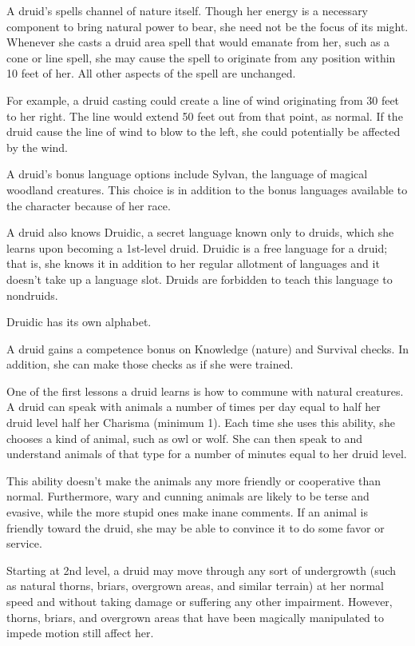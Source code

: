  A druid's spells channel of nature itself. Though her energy is a necessary component to bring natural power to bear, she need not be the focus of its might. Whenever she casts a druid area spell that would emanate from her, such as a cone or line spell, she may cause the spell to originate from any position within 10 feet of her. All other aspects of the spell are unchanged.

For example, a druid casting  could create a line of wind originating from 30 feet to her right. The line would extend 50 feet out from that point, as normal. If the druid cause the line of wind to blow to the left, she could potentially be affected by the wind.

 A druid's bonus language options include Sylvan, the language of magical woodland creatures. This choice is in addition to the bonus languages available to the character because of her race.

A druid also knows Druidic, a secret language known only to druids, which she learns upon becoming a 1st-level druid. Druidic is a free language for a druid; that is, she knows it in addition to her regular allotment of languages and it doesn't take up a language slot. Druids are forbidden to teach this language to nondruids.

Druidic has its own alphabet.

 A druid gains a  competence bonus on Knowledge (nature) and Survival checks. In addition, she can make those checks as if she were trained.

 One of the first lessons a druid learns is how to commune with natural creatures. A druid can speak with animals a number of times per day equal to half her druid level \add half her Charisma (minimum 1). Each time she uses this ability, she chooses a kind of animal, such as owl or wolf. She can then speak to and understand animals of that type for a number of minutes equal to her druid level.

This ability doesn't make the animals any more friendly or cooperative than normal. Furthermore, wary and cunning animals are likely to be terse and evasive, while the more stupid ones make inane comments. If an animal is friendly toward the druid, she may be able to convince it to do some favor or service.

 Starting at 2nd level, a druid may move through any sort of undergrowth (such as natural thorns, briars, overgrown areas, and similar terrain) at her normal speed and without taking damage or suffering any other impairment. However, thorns, briars, and overgrown areas that have been magically manipulated to impede motion still affect her.

